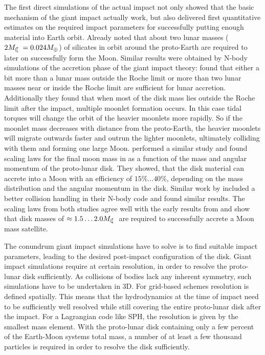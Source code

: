 The first direct simulations \citep{Benz:1985p1755, Benz:1989p1893, Cameron:2000p1854} of the actual impact not only showed that the basic mechanism of the giant impact actually work, but also delivered first quantitative estimates on the required impact parameters for successfully putting enough material into Earth orbit. Already \cite{1975Icar...24..504H} noted that about two lunar masses ($2 \ML = 0.024 \ME$) of silicates in orbit around the proto-Earth are required to later on successfully form the Moon. Similar results were obtained by N-body simulations of the accretion phase of the giant impact theory: \cite{Canup:1996p3541} found that either a bit more than a lunar mass outside the Roche limit or more than two lunar masses near or inside the Roche limit are sufficient for lunar accretion. Additionally they found that when most of the disk mass lies outside the Roche limit after the impact, multiple moonlet formation occurs. In this case tidal torques will change the orbit of the heavier moonlets more rapidly. So if the moonlet mass decreases with distance from the proto-Earth, the heavier moonlets will migrate outwards faster and outrun the lighter moonlets, ultimately colliding with them and forming one large Moon. \cite{Ida:1997p3395} performed a similar study and found scaling laws for the final moon mass in as a function of the mass and angular momentum of the proto-lunar disk. They showed, that the disk material can accrete into a Moon with an efficiency of $15 \% \dots 40 \%$, depending on the mass distribution and the angular momentum in the disk. Similar work by \cite{Kokubo:2000p2195} included a better collision handling in their N-body code and found similar results. The scaling laws from both studies agree well with the early results from \cite{Canup:1996p3541} and show that disk masses of $\approx 1.5 \dots 2.0 \ML$ are required to successfully accrete a Moon mass satellite.

The conundrum giant impact simulations have to solve is to find suitable impact parameters, leading to the desired post-impact configuration of the disk. Giant impact simulations require at certain resolution, in order to resolve the proto-lunar disk sufficiently. As collisions of bodies lack any inherent symmetry, such simulations have to be undertaken in 3D. For grid-based schemes resolution is defined spatially. This means that the hydrodynamics at the time of impact need to be sufficiently well resolved while still covering the entire proto-lunar disk after the impact. For a Lagrangian code like SPH, the resolution is given by the smallest mass element. With the proto-lunar disk containing only a few percent of the Earth-Moon systems total mass, a number of at least a few thousand particles is required in order to resolve the disk sufficiently.

